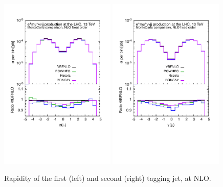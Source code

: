 \documentclass[a4paper,10pt]{report}
\begin{document}
\begin{figure}[h!]
   \centering
   \includegraphics[width=0.49\textwidth,angle=0,clip=true,trim={0.4cm 2.5cm 0.6cm 1.cm}]{figures/yj1_NLO.pdf}
   \includegraphics[width=0.49\textwidth,angle=0,clip=true,trim={0.4cm 2.5cm 0.6cm 1.cm}]{figures/yj2_NLO.pdf}
\caption{\label{fig:yj1-2NLO}Rapidity of the first (left) and second (right) tagging jet, at NLO.
}
\end{figure}
%
\end{document}
